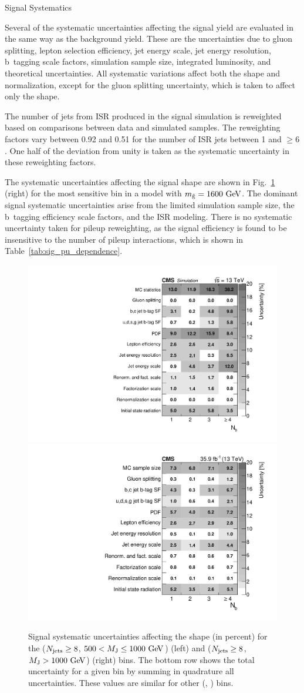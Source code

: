 \begin{section}{Signal Systematics}

Several of the systematic uncertainties affecting the signal yield are evaluated in the same way as the background yield.
These are the uncertainties due to gluon splitting, lepton selection efficiency, jet energy scale, jet energy resolution, b~tagging scale factors, simulation sample size, integrated luminosity, and theoretical uncertainties.
All systematic variations affect both the \Nb shape and normalization, except for the gluon splitting uncertainty, which is taken to affect only the \Nb shape.

The number of jets from ISR produced in the signal simulation is reweighted based on comparisons between data and simulated \ttbar samples.
The reweighting factors vary between 0.92 and 0.51 for the number of ISR jets between 1 and $\ge6$.
One half of the deviation from unity is taken as the systematic uncertainty in these reweighting factors.

The systematic uncertainties affecting the signal \Nb shape are shown in Fig.~\ref{fig:sig_sys_tables} (right) for the most sensitive bin in a model with $m_{\tilde{\mathrm{g}}} = 1600~\mathrm{Ge\kern -0.1em V}$.
The dominant signal systematic uncertainties arise from the limited simulation sample size, the b~tagging efficiency scale factors, and the ISR modeling.
There is no systematic uncertainty taken for pileup reweighting, as the signal efficiency is found to be insensitive to the number of pileup interactions, which is shown in Table~\ref{tab:sig_pu_dependence}.

\begin{figure}[tbp!]
\begin{center}
\includegraphics[angle=0,width=0.45\columnwidth]{fig/table_sig_systs_bin20_m1600.pdf}
\includegraphics[angle=0,width=0.45\columnwidth]{fig/table_sig_systs_bin21_m1600.pdf}
\end{center}
\caption{Signal systematic uncertainties affecting the \Nb shape (in percent) for the ($N_{\mathrm{jets}} \geq 8$, $500 < M_{\mathrm{J}} \leq 1000~\mathrm{Ge\kern -0.1em V}$) (left) and ($N_{\mathrm{jets}} \geq 8$, $M_{\mathrm{J}} > 1000~\mathrm{Ge\kern -0.1em V}$) (right) bins.
The bottom row shows the total uncertainty for a given \Nb bin by summing in quadrature all uncertainties.
These values are similar for other (\Njets, \MJ) bins.}
\label{fig:sig_sys_tables}
\end{figure}


\end{section}

